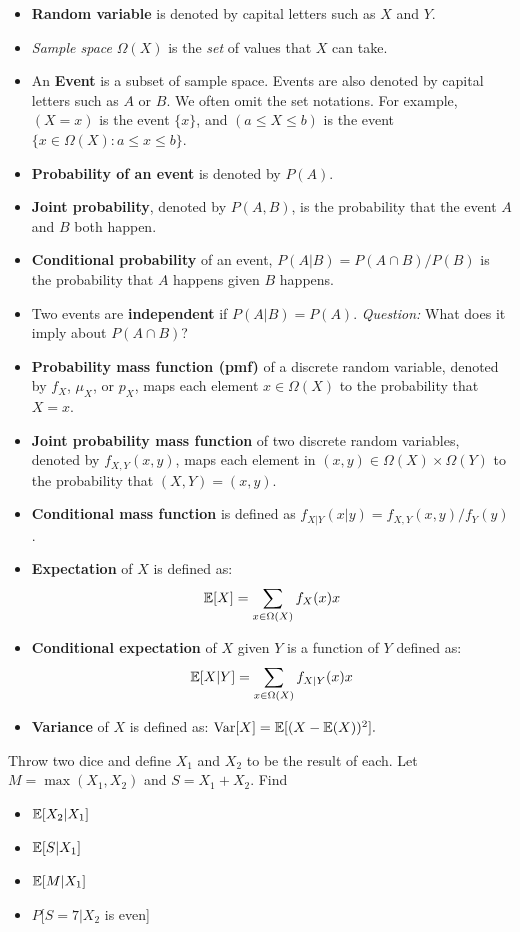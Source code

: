 \documentclass{discussion}
\begin{document}
\begin{itemize}
\item \textbf{Random variable} is denoted by capital letters such as $X$ and $Y$.
\item \textit{Sample space} $\Omega(X)$ is the \textit{set} of values that $X$ can take.
\item An \textbf{Event} is a subset of sample space. Events are also denoted by capital letters such as $A$ or $B$. We often omit the set notations. For example, $(X = x)$ is the event $\{x\}$, and $(a \leq X \leq b)$ is the event $\{x \in \Omega(X): a \leq x \leq b\}$.
\item \textbf{Probability of an event} is denoted by $P(A)$.
\item \textbf{Joint probability}, denoted by $P(A,B)$, is the probability that the event $A$ and $B$ both happen.
\item \textbf{Conditional probability} of an event, $P(A | B) = P(A \cap B) / P(B)$ is the probability that $A$ happens given $B$ happens.
\item Two events are \textbf{independent} if $P(A | B) = P(A)$. \textit{Question:} What does it imply about $P(A \cap B)$?
\item \textbf{Probability mass function (pmf)} of a discrete random variable, denoted by $f_X$, $\mu_X$, or $p_X$, maps each element $x \in \Omega(X)$ to the probability that $X = x$.
\item \textbf{Joint probability mass function} of two discrete random variables, denoted by $f_{X,Y}(x, y)$, maps each element in $(x,y) \in \Omega(X) \times \Omega(Y)$ to the probability that $(X,Y) = (x,y)$.
\item \textbf{Conditional mass function} is defined as $f_{X|Y}(x | y) = f_{X,Y}(x,y) / f_Y(y)$.
\item \textbf{Expectation} of $X$ is defined as:
\[\mathbb{E}[X] = \sum_{x \in \Omega(X)} f_X(x) x \]
\item \textbf{Conditional expectation} of $X$ given $Y$ is a function of $Y$ defined as:
\[\mathbb{E}[X | Y] = \sum_{x \in \Omega(X)} f_{X | Y}(x) x \]
\item \textbf{Variance} of $X$ is defined as: $\mathrm{Var}[X] = \mathbb{E}[(X - \mathbb{E}(X))^2].$
\end{itemize}

\vspace{1em}

\begin{exercise}
Throw two dice and define $X_1$ and $X_2$ to be the result of each. Let $M = \max(X_1, X_2)$ and $S = X_1 + X_2$. Find 
\begin{itemize}
\item $\mathbb{E}[X_2 | X_1]$
\item $\mathbb{E}[S | X_1]$
\item $\mathbb{E}[M | X_1]$
\item $P[S = 7   | X_2$ is even]
\end{itemize}
\end{exercise}
\end{document}
